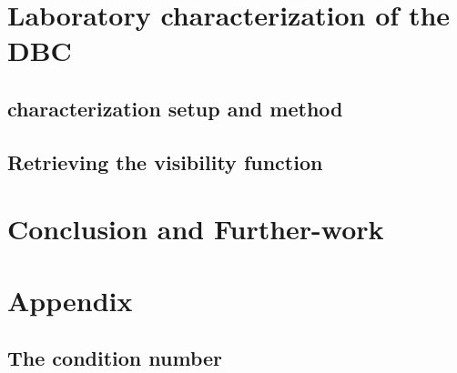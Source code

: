\documentclass[a4paper,twoside,11pt]{article}
\makeatletter
\newcommand\backmatter{%
  \if@openright
    \clearpage
  \else
    \clearpage
  \fi
   }
\makeatother
\begin{document}
\section{Laboratory characterization of the DBC}

    \subsection{characterization setup and method}
    
    \subsection{Retrieving the visibility function}

\section*{Conclusion and Further-work}

\backmatter
\appendix
\section{Appendix}
    \subsection{The condition number}\label{an:cond}
    

\printglossary
    


\end{document}

